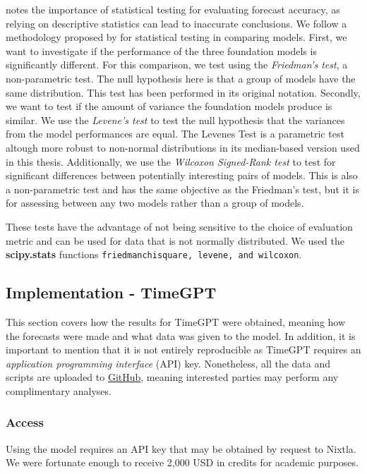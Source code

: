 \documentclass[12pt,a4paper]{article}
\begin{document}
\cite{Koning2005} notes the importance of statistical testing for evaluating forecast accuracy, as relying on descriptive statistics can lead to inaccurate conclusions. We follow a methodology proposed by \cite{Rainio2024} for statistical testing in comparing models. First, we want to investigate if the performance of the three foundation models is significantly different. For this comparison, we test using the \textit{Friedman’s test}, a non-parametric test. The null hypothesis here is that a group of models have the same distribution. This test has been performed in its original notation. Secondly, we want to test if the amount of variance the foundation models produce is similar. We use the \textit{Levene’s test} to test the null hypothesis that the variances from the model performances are equal. The Levenes Test is a parametric test altough more robust to non-normal distributions in its median-based version used in this thesis. Additionally, we use the \textit{Wilcoxon Signed-Rank test} to test for significant differences between potentially interesting pairs of models. This is also a non-parametric test and has the same objective as the Friedman’s test, but it is for assessing between any two models rather than a group of models. 


These tests have the advantage of not being sensitive to the choice of evaluation metric and can be used for data that is not normally distributed. We used the \textbf{scipy.stats} functions \texttt{friedmanchisquare, levene, and wilcoxon}.

\subsection{Implementation - TimeGPT}

This section covers how the results for TimeGPT were obtained, meaning how the forecasts were made and what data was given to the model. In addition, it is important to mention that it is not entirely reproducible as TimeGPT requires an \textit{application programming interface} (API) key. Nonetheless, all the data and scripts are uploaded to \href{https://github.com/tom-alten/Outsmarting-Time/}{GitHub}, meaning interested parties may perform any complimentary analyses.  

\subsubsection{Access}

Using the model requires an API key that may be obtained by request to Nixtla. We were fortunate enough to receive 2,000 USD in credits for academic purposes. 
\end{document}
